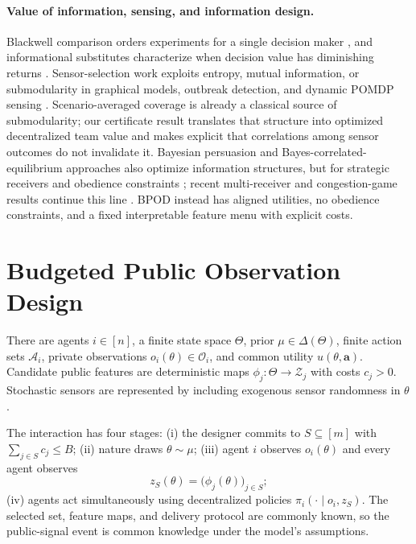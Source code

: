 \paragraph{Value of information, sensing, and information design.}
Blackwell comparison orders experiments for a single decision maker \cite{Blackwell1953}, and informational substitutes characterize when decision value has diminishing returns \cite{ChenWaggoner2016}. Sensor-selection work exploits entropy, mutual information, or submodularity in graphical models, outbreak detection, and dynamic POMDP sensing \cite{GuestrinEtAl2005,KrauseGuestrin2005,KrauseEtAl2008,LeskovecEtAl2007,SatsangiEtAl2015,GolovinKrause2011}. Scenario-averaged coverage is already a classical source of submodularity; our certificate result translates that structure into optimized decentralized team value and makes explicit that correlations among sensor outcomes do not invalidate it. Bayesian persuasion and Bayes-correlated-equilibrium approaches also optimize information structures, but for strategic receivers and obedience constraints \cite{KamenicaGentzkow2011,DughmiXu2017,BergemannMorris2016}; recent multi-receiver and congestion-game results continue this line \cite{ShakiEtAl2025,GriesbachEtAl2024}. BPOD instead has aligned utilities, no obedience constraints, and a fixed interpretable feature menu with explicit costs.

\section{Budgeted Public Observation Design}

There are agents $i\in[n]$, a finite state space $\Theta$, prior $\mu\in\Delta(\Theta)$, finite action sets $\mathcal A_i$, private observations $o_i(\theta)\in\mathcal O_i$, and common utility $u(\theta,\mathbf a)$. Candidate public features are deterministic maps $\phi_j:\Theta\to\mathcal Z_j$ with costs $c_j>0$. Stochastic sensors are represented by including exogenous sensor randomness in $\theta$.

The interaction has four stages: (i) the designer commits to $S\subseteq[m]$ with $\sum_{j\in S}c_j\le B$; (ii) nature draws $\theta\sim\mu$; (iii) agent $i$ observes $o_i(\theta)$ and every agent observes
\[
z_S(\theta)=\bigl(\phi_j(\theta)\bigr)_{j\in S};
\]
(iv) agents act simultaneously using decentralized policies $\pi_i(\cdot\mid o_i,z_S)$. The selected set, feature maps, and delivery protocol are commonly known, so the public-signal event is common knowledge under the model's assumptions.

